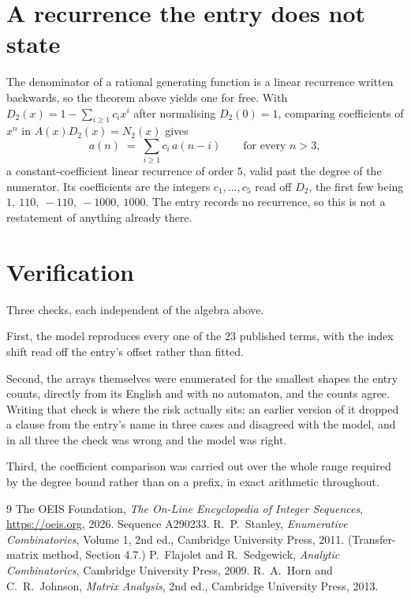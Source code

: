 \documentclass[11pt,a4paper]{article}
\theoremstyle{plain}
\theoremstyle{definition}
\begin{document}
\section{A recurrence the entry does not state}

The denominator of a rational generating function is a linear recurrence written backwards, so
the theorem above yields one for free. With $D_2(x)=1-\sum_{i\ge1}c_ix^i$ after normalising
$D_2(0)=1$, comparing coefficients of $x^n$ in $A(x)D_2(x)=N_2(x)$ gives
\[
a(n)\;=\;\sum_{i\ge1}c_i\,a(n-i)\qquad\text{for every }n>3,
\]
a constant-coefficient linear recurrence of order $5$, valid past the degree of the
numerator. Its coefficients are the integers $c_1,\dots,c_{5}$ read off $D_2$, the first few being $1,\ 110,\ -110,\ -1000,\ 1000$. The entry records no recurrence, so this is not a restatement of anything
already there.

\section{Verification}

Three checks, each independent of the algebra above.

First, the model reproduces every one of the $23$ published terms, with the index shift
read off the entry's offset rather than fitted.

Second, the arrays themselves were enumerated for the smallest shapes the entry counts,
directly from its English and with no automaton, and the counts agree. Writing that check is
where the risk actually sits: an earlier version of it dropped a clause from the entry's name
in three cases and disagreed with the model, and in all three the check was wrong and the model
was right.

Third, the coefficient comparison was carried out over the whole range required by the degree
bound rather than on a prefix, in exact arithmetic throughout.

\begin{thebibliography}{9}
 The OEIS Foundation, \emph{The On-Line Encyclopedia of Integer
Sequences}, \url{https://oeis.org}, 2026. Sequence A290233.
 R.~P.~Stanley, \emph{Enumerative Combinatorics}, Volume 1, 2nd ed.,
Cambridge University Press, 2011. (Transfer-matrix method, Section 4.7.)
 P.~Flajolet and R.~Sedgewick, \emph{Analytic Combinatorics}, Cambridge
University Press, 2009.
 R.~A.~Horn and C.~R.~Johnson, \emph{Matrix Analysis}, 2nd ed., Cambridge
University Press, 2013.
\end{thebibliography}
\end{document}
